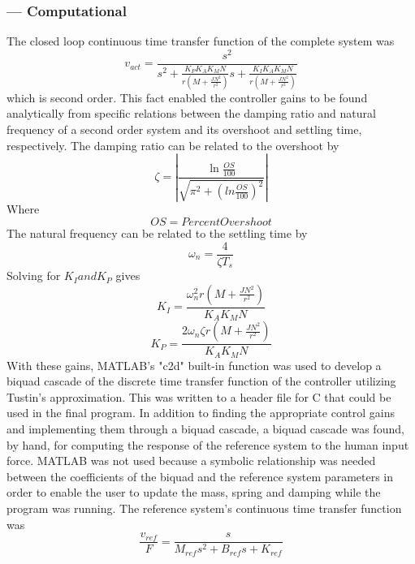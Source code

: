 \subsubsection*{ --- Computational}
The closed loop continuous time transfer function of the complete system was 
\begin{equation}
v_{act}=\frac{s^{2}}{s^{2}+\frac{K_{P}K_{A}K_{M}N}{r(M+\frac{JN^{2}}{r^{2}})}s+\frac{K_{I}K_{A}K_{M}N}{r(M+\frac{JN^{2}}{r^{2}})}}
\end{equation}
which is second order. This fact enabled the controller gains to be found analytically from specific relations between the damping ratio and natural frequency of a second order system and its overshoot and settling time, respectively. The damping ratio can be related to the overshoot by
\begin{equation}
\zeta=|\frac{\ln{\frac{OS}{100}}}{\sqrt{\pi^{2}+(ln{\frac{OS}{100}})^{2}}}|
\end{equation}
Where
\begin{equation}
OS=Percent Overshoot
\end{equation}
The natural frequency can be related to the settling time by
\begin{equation}
\omega_{n}=\frac{4}{\zeta T_{s}}
\end{equation}
Solving for $ K_{I} and K_{P} $ gives
\begin{equation}
K_{I}=\frac{\omega_{n}^{2}r(M+\frac{JN^{2}}{r^{2}})}{K_{A}K_{M}N}
\end{equation}
\begin{equation}
K_{P}=\frac{2\omega_{n}\zeta r(M+\frac{JN^{2}}{r^{2}})}{K_{A}K_{M}N}
\end{equation}
With these gains, MATLAB's "c2d" built-in function was used to develop a biquad cascade of the discrete time transfer function of the controller utilizing Tustin's approximation. This was written to a header file for C that could be used in the final program.
In addition to finding the appropriate control gains and implementing them through a biquad cascade, a biquad cascade was found, by hand, for computing the response of the reference system to the human input force. MATLAB was not used because a symbolic relationship was needed between the coefficients of the biquad and the reference system parameters in order to enable the user to update the mass, spring and damping while the program was running. The reference system's continuous time transfer function was
\begin{equation}
\frac{v_{ref}}{F}=\frac{s}{M_{ref}s^{2}+B_{ref}s+K_{ref}}
\end{equation}
